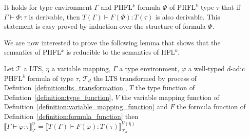 \begin{remark}
    It holds for type environment $\Gamma$ and PHFL$^k$ formula $\Phi$ of PHFL$^k$ type $\tau$ that if $\Gamma \vdash
    \Phi \colon \tau$ is derivable, then $T(\Gamma) \vdash F(\Phi) \colon T(\tau)$ is also derivable. This statement
    is easy proved by induction over the structure of formula $\Phi$.
\end{remark}

We are now interested to prove the following lemma that shows that the semantics of PHFL$^k$ is
reducible to the semantics of HFL$^k$.

\begin{lemma}
    \label{lemma:model_check_phfl_k}
    Let $\mathcal{T}$ a LTS, $\eta$ a variable mapping, $\Gamma$ a type environment, $\varphi$ a well-typed $d$-adic
    PHFL$^k$ formula of type $\tau$, $\mathcal{T}_d$ the LTS transformed by process of
    Defintion~\ref{definition:lts_transformation}, $T$ the type function of Defintion~\ref{definition:type_function},
    $V$ the variable mapping function of Definition~\ref{definition:variable_mapping_function}
    and $F$ the formula function of Definition~\ref{definition:formula_function} then $\llbracket \Gamma \vdash
    \varphi \colon \tau \rrbracket^\eta_\mathcal{T} = \llbracket T(\Gamma) \vdash F(\varphi) \colon T(\tau)
    \rrbracket^{V(\eta)}_{\mathcal{T}_d}$
\end{lemma}


